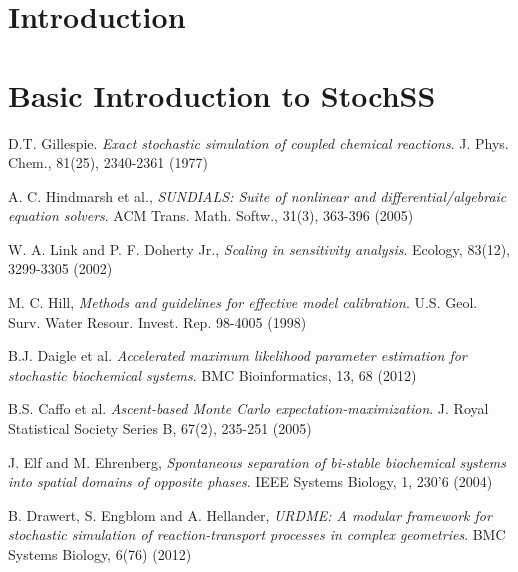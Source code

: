 \documentclass[report,openany]{memoir}
\title{\rightline{\HUGE StochSS: Stochastic Simulation Service}}
\date{}
\begin{document}
\maketitle

\tableofcontents

\chapter{Introduction}



\chapter{Basic Introduction to StochSS}









\begin{thebibliography}{9}

  D.T. Gillespie.
  \textit{Exact stochastic simulation of coupled chemical reactions}.
  J. Phys. Chem., 81(25), 2340-2361 (1977)

  A. C. Hindmarsh et al.,
  \textit{SUNDIALS: Suite of nonlinear and differential/algebraic equation solvers}.
  ACM Trans. Math. Softw., 31(3), 363-396 (2005)
  
  W. A. Link and P. F. Doherty Jr.,
  \textit{Scaling in sensitivity analysis}.
  Ecology, 83(12), 3299-3305 (2002)
  
  M. C. Hill,
  \textit{Methods and guidelines for effective model calibration}. 
  U.S. Geol. Surv. Water Resour. Invest. Rep. 98-4005 (1998)
  
  B.J. Daigle et al.
  \textit{Accelerated maximum likelihood parameter estimation for stochastic biochemical systems}.
  BMC Bioinformatics, 13, 68 (2012)
  
  B.S. Caffo et al.
  \textit{Ascent-based Monte Carlo expectation-maximization}. 
  J. Royal Statistical Society Series B, 67(2), 235-251 (2005)
  
  J. Elf and M. Ehrenberg,
  \textit{Spontaneous separation of bi-stable biochemical systems into spatial domains of opposite phases}. IEEE Systems Biology, 1, 230'6 (2004)
  
 B. Drawert, S. Engblom and A. Hellander, 
 \textit{URDME: {A} modular framework for stochastic simulation
of reaction-transport processes in complex geometries}. BMC Systems Biology, 6(76) (2012)
  
  
\end{thebibliography}
\end{document}
